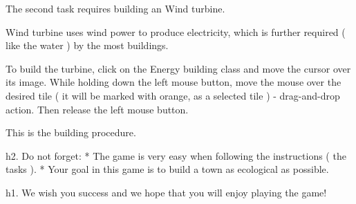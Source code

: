 The second task requires building an Wind turbine.

Wind turbine uses wind power to produce electricity, which is further required ( like the water ) by the most buildings.

To build the turbine, click on the Energy building class and move the cursor over its image. While holding down the left mouse button, move the mouse over the desired tile ( it will be marked with orange, as a selected tile ) - drag-and-drop action. Then release the left mouse button.

This is the building procedure.

h2. Do not forget: 
* The game is very easy when following the instructions ( the tasks ).
* Your goal in this game is to build a town as ecological as possible.

h1. We wish you success and we hope that you will enjoy playing the game!
